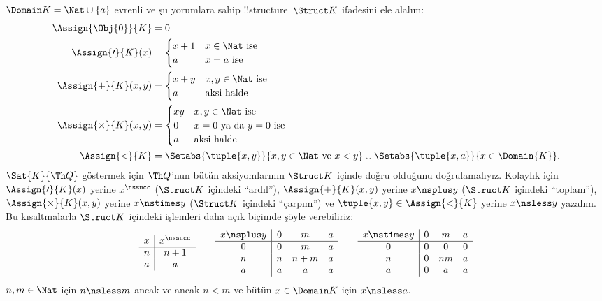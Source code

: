 \documentclass[../../../include/open-logic-section]{subfiles}
\begin{document}
\begin{ex}
$\Domain K=\Nat\cup\{a\}$ evrenli ve şu yorumlara sahip
!!{structure}~$\Struct K$ ifadesini ele alalım:
\begin{align*}
  \Assign{\Obj{0}}{K} & = 0\\
  \Assign{\prime}{K}(x) & =
  \begin{cases}
    x+1 & \text{$x\in\Nat$ ise}\\
    a & \text{$x=a$ ise}
  \end{cases}\\
  \Assign{+}{K}(x, y) & =
  \begin{cases}
    x+y & \text{$x,y\in\Nat$ ise}\\
    a & \text{aksi halde}
  \end{cases}\\
  \Assign{\times}{K}(x, y) & =
  \begin{cases}
    xy & \text{$x,y\in\Nat$ ise}\\
    0 & \text{$x=0$ ya da $y=0$ ise}\\
    a & \text{aksi halde}\\
  \end{cases}\\
  \Assign{<}{K} & =
  \Setabs{\tuple{x,y}}{x, y \in \Nat \text{ ve } x<y} \cup
  \Setabs{\tuple{x,a}}{x \in \Domain{K}}.
\end{align*}
$\Sat{K}{\Th Q}$ göstermek için $\Th Q$'nun bütün aksiyomlarının
$\Struct K$ içinde doğru olduğunu doğrulamalıyız. Kolaylık için
$\Assign{\prime}{K}(x)$ yerine $x^\nssucc$ ($\Struct K$ içindeki
``ardıl''), $\Assign{+}{K}(x,y)$ yerine $x\nsplus y$ ($\Struct K$
içindeki ``toplam''), $\Assign{\times}{K}(x,y)$ yerine
$x\nstimes y$ ($\Struct K$ içindeki ``çarpım'') ve
$\tuple{x,y}\in\Assign{<}{K}$ yerine $x\nsless y$ yazalım. Bu
kısaltmalarla $\Struct K$ içindeki işlemleri daha açık biçimde şöyle
verebiliriz:
\[
\begin{array}{c|c}
  x & x^\nssucc \\
  \hline
  n & n+1 \\
  a & a
\end{array}
\qquad
\begin{array}{c|ccc}
  x \nsplus y & 0 & m & a \\
  \hline
  0 & 0 & m & a \\
  n & n & n+m & a \\
  a & a & a & a \\
\end{array}
\qquad
\begin{array}{c|ccc}
  x \nstimes y & 0 & m & a \\
  \hline
  0 & 0 & 0 & 0 \\
  n & 0 & nm & a \\
  a & 0 & a & a \\
\end{array}
\]
$n,m\in\Nat$ için $n\nsless m$ ancak ve ancak $n<m$ ve bütün
$x\in\Domain K$ için $x\nsless a$.


\end{ex}
\end{document}
